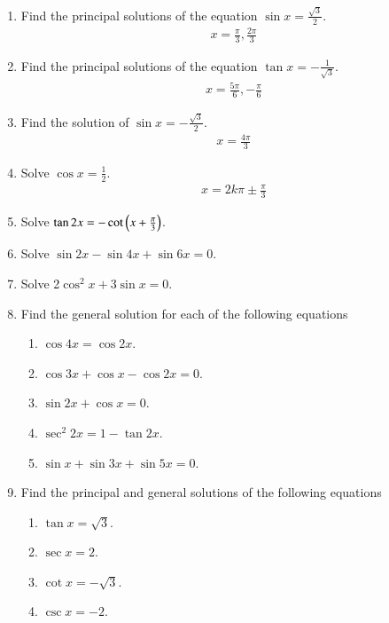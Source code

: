 \begin{enumerate}[label=\thesubsection.\arabic*,ref=\thesubsection.\theenumi]
\item Find the principal solutions of the equation $\sin x = \frac{\sqrt 3}{2}$.
%
	\\
		\solution 
\begin{align}
	x = \frac{\pi}{3}, \frac{2\pi}{3}
\end{align}
%
\item Find the principal solutions of the equation $\tan x = -\frac{1}{\sqrt 3}$.
%
	\\
\solution
\begin{align}
	x = \frac{5\pi}{6}, -\frac{\pi}{6}
\end{align}
%
\item Find the solution of $\sin x = -\frac{\sqrt 3}{2}$.
%
	\\
\solution
\begin{align}
	x = \frac{4\pi}{3}
\end{align}
%
\item Solve $\cos x = \frac{1}{2}$.
%
	\\
\solution
%
\begin{align}
	x = 2k\pi \pm \frac{\pi}{3}
\end{align}
\item Solve $\tan2x=-\cot\left(x+\frac{\pi}{3}\right)$.
%
\item Solve $\sin2x-\sin4x+\sin6x=0$.
%
%
\item Solve 2$\cos^{2}x+3\sin x=0$.
%
\item Find the general solution for each of the following equations
\begin{enumerate}
\item $\cos4x=\cos2x$.
\item $\cos3x+\cos x-\cos2x=0$.
\item $\sin2x+\cos x=0$.
\item $\sec^{2}2x=1-\tan2x$.
\item $\sin x+\sin3x+\sin5x=0$.
\end{enumerate}
%
\item Find the principal and general solutions of the following equations
\begin{enumerate}
\item $\tan x=\sqrt 3$.
\item $\sec x=2$.
\item $\cot x=-\sqrt 3$.
\item $\csc x=-2$.
\end{enumerate}
\end{enumerate}
